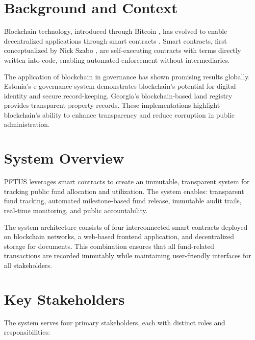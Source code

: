 \documentclass[12pt,a4wide]{report}
\theoremstyle{plain}
\theoremstyle{definition}
\theoremstyle{remark}
\begin{document}
\section{Background and Context}

Blockchain technology, introduced through Bitcoin \cite{nakamoto2008}, has evolved to enable decentralized applications through smart contracts \cite{buterin2014}. Smart contracts, first conceptualized by Nick Szabo \cite{szabo1994}, are self-executing contracts with terms directly written into code, enabling automated enforcement without intermediaries.

The application of blockchain in governance has shown promising results globally. Estonia's e-governance system \cite{estonia2017} demonstrates blockchain's potential for digital identity and secure record-keeping. Georgia's blockchain-based land registry \cite{georgia2016} provides transparent property records. These implementations highlight blockchain's ability to enhance transparency and reduce corruption in public administration.

\section{System Overview}

PFTUS leverages smart contracts to create an immutable, transparent system for tracking public fund allocation and utilization. The system enables: transparent fund tracking, automated milestone-based fund release, immutable audit trails, real-time monitoring, and public accountability.

The system architecture consists of four interconnected smart contracts deployed on blockchain networks, a web-based frontend application, and decentralized storage for documents. This combination ensures that all fund-related transactions are recorded immutably while maintaining user-friendly interfaces for all stakeholders.

\section{Key Stakeholders}

The system serves four primary stakeholders, each with distinct roles and responsibilities:
\end{document}

